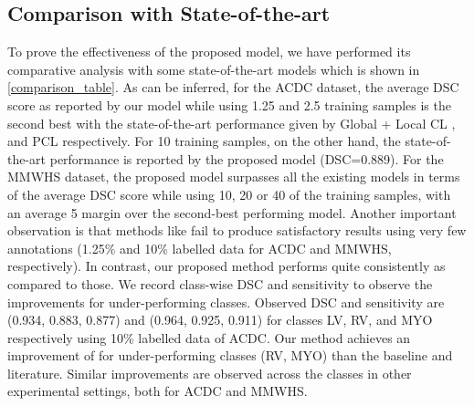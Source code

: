 \documentclass[runningheads]{llncs}
\begin{document}
\subsection{Comparison with State-of-the-art}
To prove the effectiveness of the proposed model, we have performed its comparative analysis with some state-of-the-art models \cite{chen2020simple,hu2021semi,chen2019self,chaitanya2019semi} which is shown in \autoref{comparison_table}. As can be inferred, for the ACDC dataset, the average DSC score as reported by our model while using 1.25 and 2.5 training samples is the second best with the state-of-the-art performance given by Global + Local CL \cite{chaitanya2020contrastive}, and PCL \cite{zeng2021positional} respectively. For 10 training samples, on the other hand, the state-of-the-art performance is reported by the proposed model (DSC=0.889). For the MMWHS dataset, the proposed model surpasses all the existing models in terms of the average DSC score while using 10, 20 or 40 of the training samples, with an average 5 margin over the second-best performing model. Another important observation is that methods like \cite{zeng2021positional,bai2017semi,hu2021semi} fail to produce satisfactory results using very few annotations (1.25\% and 10\% labelled data for ACDC and MMWHS, respectively). In contrast, our proposed method performs quite consistently as compared to those. We record class-wise DSC and sensitivity to observe the improvements for under-performing classes. Observed DSC and sensitivity are (0.934, 0.883, 0.877) and (0.964, 0.925, 0.911) for classes LV, RV, and MYO respectively using 10\% labelled data of ACDC. Our method achieves an improvement of  for under-performing classes (RV, MYO) than the baseline and literature. Similar improvements are observed across the classes in other experimental settings, both for ACDC and MMWHS.
\end{document}
